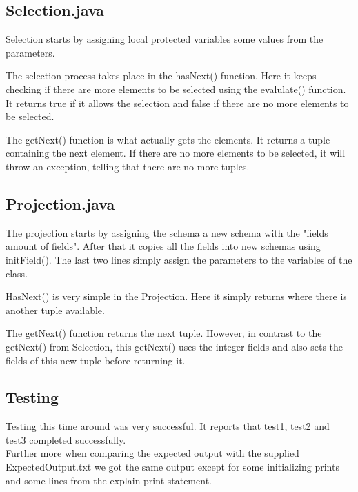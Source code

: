 \documentclass[a4paper,10pt,titlepage]{report}
\begin{document}
\subsection{Selection.java}
Selection starts by assigning local protected variables some values from the parameters. 

The selection process takes place in the hasNext() function. Here it keeps checking if there are more elements to be selected using the evalulate() function. It returns true if it allows the selection and false if there are no more elements to be selected.

The getNext() function is what actually gets the elements. It returns a tuple containing the next element. If there are no more elements to be selected, it will throw an exception, telling that there are no more tuples.

\vspace{10mm}
\subsection{Projection.java}
The projection starts by assigning the schema a new schema with the "fields amount of fields". After that it copies all the fields into new schemas using initField(). The last two lines simply assign the parameters to the variables of the class.

HasNext() is very simple in the Projection. Here it simply returns where there is another tuple available.

The getNext() function returns the next tuple. However, in contrast to the getNext() from Selection, this getNext() uses the integer fields and also sets the fields of this new tuple before returning it. 

\subsection{Testing}
Testing this time around was very successful. It reports that test1, test2 and test3 completed successfully. \\
Further more when comparing the expected output with the supplied ExpectedOutput.txt we got the same output except for some initializing  prints and some lines from the explain print statement. \\
\end{document}

